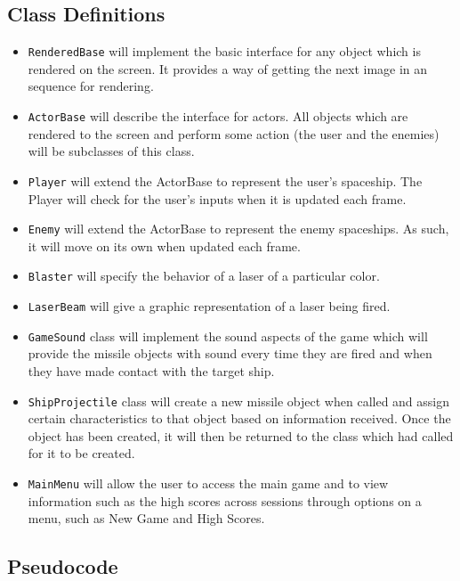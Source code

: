 \subsection*{Class Definitions}
    \begin{itemize}
        \item \texttt{RenderedBase} will implement the basic
        interface for any object which is rendered on the screen.
        It provides a way of getting the next image in an sequence
        for rendering.
        \item \texttt{ActorBase} will describe the interface
        for actors.  All objects which are rendered to the screen and
        perform some action (the user and the enemies) will be subclasses
        of this class.
        \item \texttt{Player} will extend the ActorBase to
        represent the user's spaceship. The Player will check for the user's
        inputs when it is updated each frame.
        \item \texttt{Enemy} will extend the ActorBase to represent
        the enemy spaceships. As such, it will move on its own when updated
        each frame.
        \item \texttt{Blaster} will specify the behavior of a
        laser of a particular color.
        \item \texttt{LaserBeam} will give a graphic representation
        of a laser being fired.
        \item \texttt{GameSound} class will implement
        the sound aspects of the game which will provide the
        missile objects with sound every time they are fired and
        when they have made contact with the target
        ship.
        \item \texttt{ShipProjectile} class will create
        a new missile object when called and assign certain
        characteristics to that object based on information
        received. Once the object has been created, it will then
        be returned to the class which had called for it to be created.
        \item \texttt{MainMenu} will allow the user to access
        the main game and to view information such as the high scores
        across sessions through options on a menu, such as New Game and
        High Scores.
    \end{itemize}

\subsection*{Pseudocode}
    \inputminted{python}{../assets/base_classes.py}

